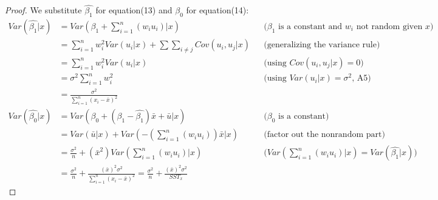\documentclass[a4paper, 10pt]{article}
\theoremstyle{definition}	%
\begin{document}
\begin{proof} 
    We substitute $\hat{\beta_1}$ for equation(13) and $\hat{\beta_0}$ for equation(14):
    \begin{align*}
        Var(\hat{\beta_1}|x) &= Var(\beta_1 + \sum_{i=1}^{n}(w_i u_i)|x)
        && \text{($\beta_1$ is a constant and $w_i$ not random given $x$)}\\
        &= \sum_{i=1}^{n}w_i^2 Var(u_i|x) + \sum \sum_{i \neq j}Cov(u_i,u_j|x) 
        && \text{(generalizing the variance rule)}\\
        &= \sum_{i=1}^{n}w_i^2 Var(u_i|x)
        && \text{(using $Cov(u_i,u_j|x) = 0$)}\\
        &= \sigma^2 \sum_{i=1}^{n}w_i^2
        && \text{(using $Var(u_i|x) = \sigma^2$, A5)}\\
        &= \frac{\sigma^2}{\sum_{i=1}^{n} \left(x_i - \bar{x}\right)^2}\\
        Var(\hat{\beta_0}|x) &= Var(\beta_0 + (\beta_1 - \hat{\beta_1})\bar{x} + \bar{u}|x)
        && \text{($\beta_0$ is a constant)}\\
        &= Var(\bar{u}|x) + Var\left(-\left(\sum_{i=1}^{n}(w_i u_i)\right)\bar{x}|x\right)
        && \text{(factor out the nonrandom part)}\\
        &= \frac{\sigma^2}{n} + (\bar{x}^2)Var\left(\sum_{i=1}^{n}(w_i u_i)|x\right)
        && \text{($Var\left(\sum_{i=1}^{n}(w_i u_i)|x\right) = Var(\hat{\beta_1}|x)$)}\\
        & = \frac{\sigma^2}{n} + \frac{(\bar{x})^2 \sigma^2}{\sum_{i=1}^{n} \left(x_i - \bar{x}\right)^2} = \frac{\sigma^2}{n} + \frac{(\bar{x})^2 \sigma^2}{SST_x}
    \end{align*}
\end{proof}
\end{document}
